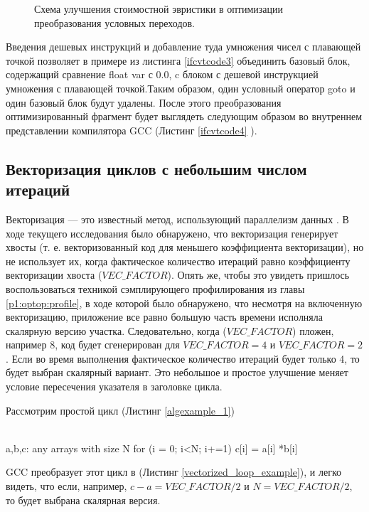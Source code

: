 \begin{figure}[htbp]
	\centering
	
	\caption{Схема улучшения стоимостной эвристики в оптимизации преобразования условных переходов.}
	\label{ifcvt2svg1}
\end{figure}

Введения дешевых инструкций и добавление туда умножения чисел с плавающей точкой позволяет в примере из листинга \ref{ifcvtcode3} объединить  базовый блок, содержащий сравнение float var с 0.0, c блоком с дешевой инструкцией умножения с плавающей точкой.Таким образом, один условный оператор goto и один базовый блок будут удалены. После этого преобразования оптимизированный фрагмент будет выглядеть следующим образом во внутреннем представлении компилятора GCC (Листинг \ref{ifcvtcode4} ).

\subsection {Векторизация циклов с небольшим числом итераций}
Векторизация — это известный метод, использующий параллелизм данных \cite{nuzman2006autovectorization}. В ходе текущего исследования было обнаружено, что векторизация генерирует хвосты (т. е. векторизованный код для меньшего коэффициента векторизации), но не использует их, когда фактическое количество итераций равно коэффициенту векторизации хвоста ($VEC\_FACTOR$). Опять же, чтобы это увидеть пришлось воспользоваться техникой сэмплирующего профилирования из главы \ref{p1:optop:profile}, в ходе которой было обнаружено, что несмотря на включенную векторизацию, приложение все равно большую часть времени исполняла скалярную версию участка. Следовательно, когда ($VEC\_FACTOR$) пложен, например 8, код будет сгенерирован для $VEC\_FACTOR = 4$ и $VEC\_FACTOR = 2$. Если во время выполнения фактическое количество итераций будет только 4, то будет выбран скалярный вариант. Это небольшое и простое улучшение меняет условие пересечения указателя в заголовке цикла.

Рассмотрим простой цикл (Листинг \ref{algexample_1})

\begin{ListingEnv}[!h]
	\captiondelim{ } %
	\caption{Простой цикл рассматриваемый оптимизацией векторизации.}\label{algexample_1}
	\begin{Verb}
		\\ a,b,c: any arrays with size N
		for (i = 0; i<N; i+=1)
		    c[i] = a[i] *b[i]
	\end{Verb}
\end{ListingEnv}
GCC преобразует этот цикл в (Листинг \ref{vectorized_loop_example}), и легко видеть, что если, например, $c-a = VEC\_FACTOR/2$ и $N = VEC\_FACTOR/2$, то будет выбрана скалярная версия.


